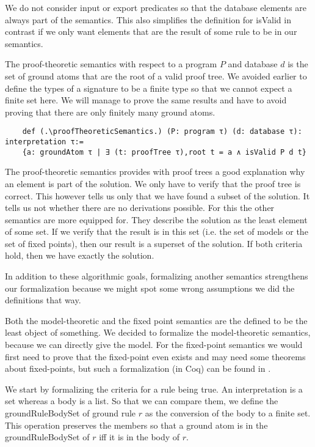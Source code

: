 We do not consider input or export predicates so that the database elements are always part of the semantics. This also simplifies the definition for isValid in contrast if we only want elements that are the result of some rule to be in our semantics.

The proof-theoretic semantics with respect to a program $P$ and database $d$ is the set of ground atoms that are the root of a valid proof tree. We avoided earlier to define the types of a signature to be a finite type so that we cannot expect a finite set here. We will manage to prove the same results and have to avoid proving that there are only finitely many ground atoms.

\begin{lstlisting}
    def (.\proofTheoreticSemantics.) (P: program τ) (d: database τ): interpretation τ:= 
    {a: groundAtom τ | ∃ (t: proofTree τ),root t = a ∧ isValid P d t}
\end{lstlisting}

The proof-theoretic semantics provides with proof trees a good explanation why an element is part of the solution. We only have to verify that the proof tree is correct. This however tells us only that we have found a subset of the solution. It tells us not whether there are no derivations possible. For this the other semantics are more equipped for. They describe the solution as the least element of some set. If we verify that the result is in this set (i.e. the set of models or the set of fixed points), then our result is a superset of the solution. If both criteria hold, then we have exactly the solution.

In addition to these algorithmic goals, formalizing another semantics strengthens our formalization because we might spot some wrong assumptions we did the definitions that way.

Both the model-theoretic and the fixed point semantics are the defined to be the least object of something. We decided to formalize the model-theoretic semantics, because we can directly give the model. For the fixed-point semantics we would first need to prove that the fixed-point even exists and may need some theorems about fixed-points, but such a formalization (in Coq) can be found in \cite{datalogCoq}.

We start by formalizing the criteria for a rule being true. An interpretation is a set whereas a body is a list. So that we can compare them, we define the groundRuleBodySet of ground rule $r$ as the conversion of the body to a finite set. This operation preserves the members so that a ground atom is in the groundRuleBodySet of $r$ iff it is in the body of $r$.


